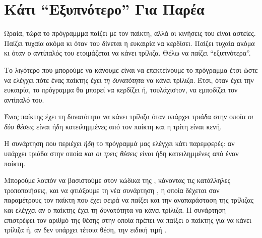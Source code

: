 \documentclass[a4paper,11pt,oneside]{book}
\begin{document}

\section{Κάτι ``Εξυπνότερο'' Για Παρέα}

\begin{question}
Ωραία, τώρα το πρόγραμμμα παίζει με τον παίκτη, αλλά οι κινήσεις του είναι αστείες. Παίζει τυχαία ακόμα κι όταν του δίνεται η ευκαιρία να κερδίσει. Παίζει τυχαία ακόμα κι όταν ο αντίπαλός του ετοιμάζεται να κάνει τρίλιζα. Θέλω να παίζει ``εξυπνότερα''.
\end{question}

Το λιγότερο που μπορούμε να κάνουμε είναι να επεκτείνουμε το πρόγραμμα έτσι ώστε να ελέγχει πότε ένας παίκτης έχει \emph{τη δυνατότητα} να κάνει τρίλιζα. Έτσι, όταν έχει την ευκαιρία, το πρόγραμμα θα μπορεί να κερδίζει ή, τουλάχιστον, να εμποδίζει τον αντίπαλό του.

Ένας παίκτης έχει τη δυνατότητα να κάνει τρίλιζα όταν υπάρχει τριάδα στην οποία \emph{οι δύο θέσεις} είναι ήδη κατειλημμένες από τον παίκτη και η τρίτη είναι κενή.

Η συνάρτηση  που περιέχει \emph{ήδη} το πρόγραμμά μας ελέγχει κάτι παρεμφερές: αν υπάρχει τριάδα στην οποία \emph{και οι τρεις θέσεις} είναι ήδη κατειλημμένες από έναν παίκτη. 

Μπορούμε λοιπόν να βασιστούμε στον κώδικα της , κάνοντας τις κατάλληλες τροποποιήσεις, και να φτιάξουμε τη νέα συνάρτηση , η οποία δέχεται σαν παραμέτρους τον παίκτη  που έχει σειρά να παίξει και την αναπαράσταση  της τρίλιζας και ελέγχει αν ο παίκτης έχει τη δυνατότητα να κάνει τρίλιζα. Η συνάρτηση επιστρέφει τον αριθμό της θέσης στην οποία πρέπει να παίξει ο παίκτης  για να κάνει τρίλιζα ή, αν δεν υπάρχει τέτοια θέση, την ειδική τιμή .


\end{document}

